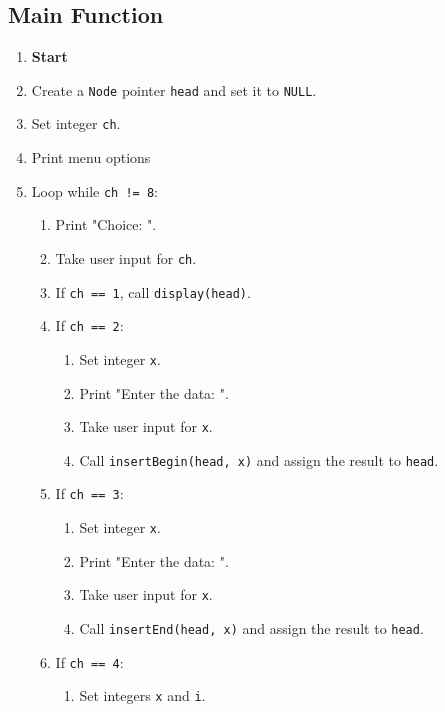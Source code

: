 {  \subsection{Main Function}
  \begin{enumerate}[label=\arabic*:,left=0pt]
    \item \textbf{Start}
    \item Create a \texttt{Node} pointer \texttt{head} and set it to \texttt{NULL}.
    \item Set integer \texttt{ch}.
    \item Print menu options
    \item Loop while \texttt{ch != 8}:
          \begin{enumerate}[label=1.\arabic*:, start=1]
            \item Print "Choice: ".
            \item Take user input for \texttt{ch}.
            \item If \texttt{ch == 1}, call \texttt{display(head)}.
            \item If \texttt{ch == 2}:
                  \begin{enumerate}[label=3.\arabic*:, start=1]
                    \item Set integer \texttt{x}.
                    \item Print "Enter the data: ".
                    \item Take user input for \texttt{x}.
                    \item Call \texttt{insertBegin(head, x)} and assign the result to \texttt{head}.
                  \end{enumerate}
            \item If \texttt{ch == 3}:
                  \begin{enumerate}[label=4.\arabic*:, start=1]
                    \item Set integer \texttt{x}.
                    \item Print "Enter the data: ".
                    \item Take user input for \texttt{x}.
                    \item Call \texttt{insertEnd(head, x)} and assign the result to \texttt{head}.
                  \end{enumerate}
            \item If \texttt{ch == 4}:
                  \begin{enumerate}[label=5.\arabic*:, start=1]
                    \item Set integers \texttt{x} and \texttt{i}.

\end{enumerate}
\end{enumerate}
\end{enumerate}}
